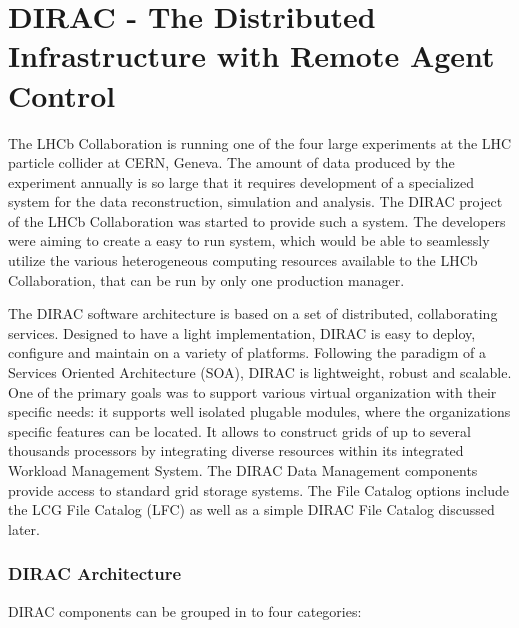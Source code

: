 \chapter{DIRAC - The Distributed Infrastructure with Remote Agent Control}
\label{chap:DIRAC}

The LHCb Collaboration \cite{LHCb} is running one of the four large experiments at the LHC particle 
collider at CERN, Geneva. The amount of data produced by the experiment
annually is so large that it requires development of a specialized system for the data reconstruction, simulation 
and analysis. The DIRAC project of the LHCb Collaboration was started to
provide such a system.\cite{Dir2} The developers were aiming to create a easy to run system, which would be able 
to seamlessly utilize the various heterogeneous computing resources available to the LHCb Collaboration, 
that can be run by only one production manager. 

The DIRAC software architecture is based on a set of distributed, collaborating services. Designed to have a
light implementation, DIRAC is easy to deploy, configure and maintain on a variety of platforms. Following
the paradigm of a Services Oriented Architecture (SOA)\cite{SOA}, DIRAC is lightweight, robust and scalable. 
One of the primary goals was to support various virtual organization with their specific needs: it supports well 
isolated plugable modules, where the organizations specific features can be located. It allows to construct
grids of up to several thousands processors by integrating diverse resources within its integrated Workload
Management System. The DIRAC Data Management components provide access to standard grid storage systems. 
The File Catalog options include the LCG File Catalog (LFC) as well as a simple DIRAC File Catalog discussed later. 

\subsection{DIRAC Architecture}
DIRAC components can be grouped in to four categories: 

